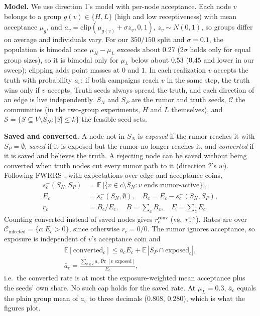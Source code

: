 
\textbf{Model.} We use direction 1's model with per-node acceptance. Each node $v$ belongs to a group $g(v)\in\{H,L\}$ (high and low receptiveness) with mean acceptance $\mu_g$, and $a_v=\mathrm{clip}(\mu_{g(v)}+\sigma z_v,0,1)$, $z_v\sim N(0,1)$, so groups differ on average and individuals vary. For our $350/150$ split and $\sigma=0.1$, the population is bimodal once $\mu_H-\mu_L$ exceeds about $0.27$ ($2\sigma$ holds only for equal group sizes), so it is bimodal only for $\mu_L$ below about $0.53$ ($0.45$ and lower in our sweep); clipping adds point masses at $0$ and $1$. In each realization $v$ accepts the truth with probability $a_v$; if both campaigns reach $v$ in the same step, the truth wins only if $v$ accepts. Truth seeds always spread the truth, and each direction of an edge is live independently. $S_N$ and $S_P$ are the rumor and truth seeds, $\mathcal{C}$ the communities (in the two-group experiments, $H$ and $L$ themselves), and $\mathcal{S}=\{S\subseteq V\setminus S_N:|S|\le k\}$ the feasible seed sets.

\textbf{Saved and converted.} A node not in $S_N$ is \emph{exposed} if the rumor reaches it with $S_P=\emptyset$, \emph{saved} if it is exposed but the rumor no longer reaches it, and \emph{converted} if it is saved and believes the truth. A rejecting node can be saved without being converted when truth nodes cut every rumor path to it (direction 2's $w$). Following FWRRS \cite{fwrrs}, with expectations over edge and acceptance coins,
\begin{align}
s^-_c(S_N,S_P) &= \mathbb{E}\,|\{v \in c \setminus S_N : v \text{ ends rumor-active}\}|, \\
E_c &= s^-_c(S_N,\emptyset),\quad B_c = E_c - s^-_c(S_N,S_P), \\
r_c &= B_c/E_c,\quad B=\textstyle\sum_c B_c,\quad E=\textstyle\sum_c E_c.
\end{align}
Counting converted instead of saved nodes gives $r_c^{\mathrm{conv}}$ (vs.\ $r_c^{\mathrm{sav}}$). Rates are over $\mathcal{C}_{\mathrm{infected}}=\{c:E_c>0\}$, since otherwise $r_c=0/0$. The rumor ignores acceptance, so exposure is independent of $v$'s acceptance coin and
\begin{gather*}
\mathbb{E}[\text{converted}_c]\le \bar a_c E_c+\mathbb{E}\,|S_P\cap \text{exposed}_c|,\\
\bar a_c=\frac{\sum_{v\in c}a_v\Pr[v\text{ exposed}]}{E_c},
\end{gather*}
i.e.\ the converted rate is at most the exposure-weighted mean acceptance plus the seeds' own share. No such cap holds for the saved rate. At $\mu_L=0.3$, $\bar a_c$ equals the plain group mean of $a_v$ to three decimals ($0.808$, $0.280$), which is what the figures plot.

